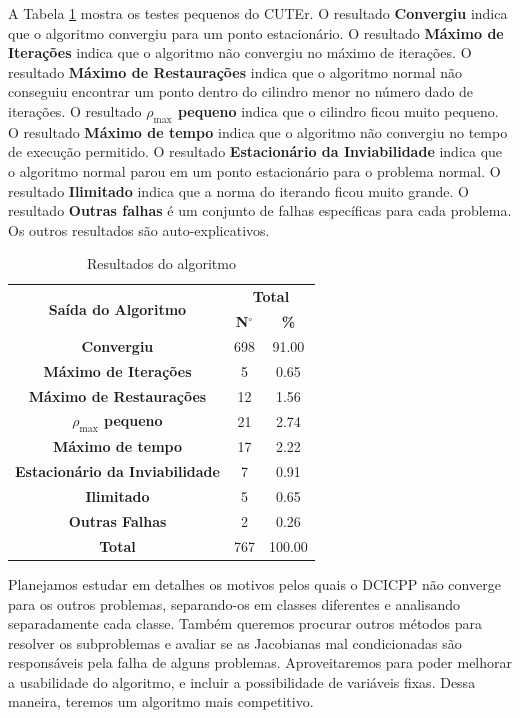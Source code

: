 \documentclass[letterpaper,12pt]{article}
\numberwithin{equation}{section}
\newcommand{\No}{N$^\circ$}
\newcommand{\rhomax}{\rho_{\max}}
\begin{document}
A Tabela \ref{tab:small} mostra os testes pequenos do CUTEr.
O resultado {\bf Convergiu} indica que o algoritmo convergiu para um ponto
estacionário.
O resultado {\bf Máximo de Iterações} indica que o algoritmo não convergiu no
máximo de iterações.
O resultado {\bf Máximo de Restaurações} indica que o algoritmo normal não
conseguiu encontrar um ponto dentro do cilindro menor no número dado de
iterações.
O resultado {\bf $\rhomax$ pequeno} indica que o cilindro ficou muito
pequeno. 
O resultado {\bf Máximo de tempo} indica que o algoritmo não convergiu no tempo
de execução permitido.
O resultado {\bf Estacionário da Inviabilidade} indica que o algoritmo normal
parou em um ponto estacionário para o problema normal.
O resultado {\bf Ilimitado} indica que a norma do iterando ficou muito grande.
O resultado {\bf Outras falhas} é um conjunto de falhas
específicas para cada problema. Os outros resultados são
auto-explicativos.

\begin{table}[!ht]
\centering
\small
\begin{tabular}{|c||c|c|} \hline
\multirow{2}{*}{\bf Saída do Algoritmo} &
\multicolumn{2}{|c|}{\bf Total} \\ \cline{2-3}
& {\bf \No} & {\bf \%}
\\ \hline
{\bf  Convergiu  } 
& 698  &  91.00   \\ \hline
{\bf  Máximo de Iterações } 
&   5  &   0.65   \\ \hline
{\bf  Máximo de Restaurações } 
&  12  &   1.56   \\ \hline
{\bf  $\rhomax$ pequeno  } 
&  21  &   2.74   \\ \hline
{\bf  Máximo de tempo  } 
&  17  &   2.22   \\ \hline
{\bf  Estacionário da Inviabilidade  } 
&   7  &   0.91   \\ \hline
{\bf  Ilimitado  } 
&   5  &   0.65   \\ \hline
{\bf  Outras Falhas  } 
&   2  &   0.26   \\ \hline
{\bf  Total  } 
& 767  & 100.00   \\ \hline
\end{tabular}
\caption{ Resultados do algoritmo }
\label{tab:small}
\end{table}

Planejamos estudar em detalhes os motivos pelos quais o
DCICPP não converge para os outros problemas, separando-os
em classes diferentes e analisando separadamente cada
classe. Também queremos procurar outros métodos para 
resolver os subproblemas e avaliar se as Jacobianas
mal condicionadas são responsáveis pela falha de alguns
problemas. 
Aproveitaremos para poder melhorar a usabilidade
do algoritmo, e incluir a possibilidade de variáveis
fixas. Dessa maneira, teremos um algoritmo mais competitivo.
\end{document}
